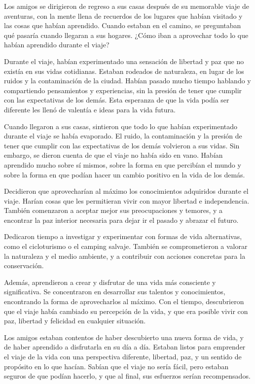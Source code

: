 

Los amigos se dirigieron de regreso a sus casas después de su memorable viaje de aventuras, con la mente llena de recuerdos de los lugares que habían visitado y las cosas que habían aprendido. Cuando estaban en el camino, se preguntaban qué pasaría cuando llegaran a sus hogares. ¿Cómo iban a aprovechar todo lo que habían aprendido durante el viaje?

Durante el viaje, habían experimentado una sensación de libertad y paz que no existía en sus vidas cotidianas. Estaban rodeados de naturaleza, en lugar de los ruidos y la contaminación de la ciudad. Habían pasado mucho tiempo hablando y compartiendo pensamientos y experiencias, sin la presión de tener que cumplir con las expectativas de los demás. Esta esperanza de que la vida podía ser diferente les llenó de valentía e ideas para la vida futura.

Cuando llegaron a sus casas, sintieron que todo lo que habían experimentado durante el viaje se había evaporado. El ruido, la contaminación y la presión de tener que cumplir con las expectativas de los demás volvieron a sus vidas. Sin embargo, se dieron cuenta de que el viaje no había sido en vano. Habían aprendido mucho sobre sí mismos, sobre la forma en que percibían el mundo y sobre la forma en que podían hacer un cambio positivo en la vida de los demás.

Decidieron que aprovecharían al máximo los conocimientos adquiridos durante el viaje. Harían cosas que les permitieran vivir con mayor libertad e independencia. También comenzaron a aceptar mejor sus preocupaciones y temores, y a encontrar la paz interior necesaria para dejar ir el pasado y abrazar el futuro.

Dedicaron tiempo a investigar y experimentar con formas de vida alternativas, como el cicloturismo o el camping salvaje. También se comprometieron a valorar la naturaleza y el medio ambiente, y a contribuir con acciones concretas para la conservación.

Además, aprendieron a crear y disfrutar de una vida más consciente y significativa. Se concentraron en desarrollar sus talentos y conocimientos, encontrando la forma de aprovecharlos al máximo. Con el tiempo, descubrieron que el viaje había cambiado su percepción de la vida, y que era posible vivir con paz, libertad y felicidad en cualquier situación.

Los amigos estaban contentos de haber descubierto una nueva forma de vida, y de haber aprendido a disfrutarla en su día a día. Estaban listos para emprender el viaje de la vida con una perspectiva diferente, libertad, paz, y un sentido de propósito en lo que hacían. Sabían que el viaje no sería fácil, pero estaban seguros de que podían hacerlo, y que al final, sus esfuerzos serían recompensados.